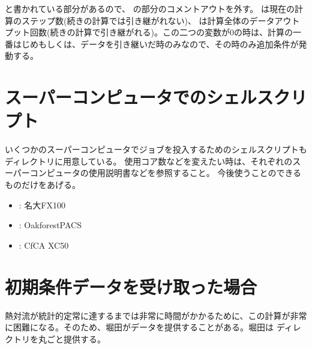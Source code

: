 \documentclass[letterpaper,10pt,dvipdfmx,report]{sphinxmanual}
\begin{document}
\begin{sphinxVerbatim}[commandchars=\\\{\}]
  
       
\end{sphinxVerbatim}

と書かれている部分があるので、  の部分のコメントアウトを外す。  は現在の計算のステップ数(続きの計算では引き継がれない)、  は計算全体のデータアウトプット回数(続きの計算で引き継がれる)。この二つの変数が0の時は、計算の一番はじめもしくは、データを引き継いだ時のみなので、その時のみ追加条件が発動する。


\section{スーパーコンピュータでのシェルスクリプト}
\label{\detokenize{start:id12}}
いくつかのスーパーコンピュータでジョブを投入するためのシェルスクリプトも  ディレクトリに用意している。
使用コア数などを変えたい時は、それぞれのスーパーコンピュータの使用説明書などを参照すること。
今後使うことのできるものだけをあげる。
\begin{itemize}
\item {} 
 : 名大FX100

\item {} 
 : Oakforest\sphinxhyphen{}PACS

\item {} 
 : CfCA XC50

\end{itemize}


\section{初期条件データを受け取った場合}
\label{\detokenize{start:id13}}
熱対流が統計的定常に達するまでは非常に時間がかかるために、この計算が非常に困難になる。そのため、堀田がデータを提供することがある。堀田は  ディレクトリを丸ごと提供する。
\end{document}
